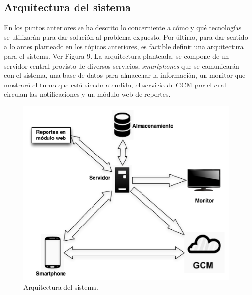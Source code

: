 \subsection{Arquitectura del sistema}

En los puntos anteriores se ha descrito lo concerniente a cómo y qué tecnologías se utilizarán para dar solución al problema expuesto. Por último, para dar sentido a lo antes planteado en los tópicos anteriores, es factible definir una arquitectura para el sistema. Ver Figura 9. La arquitectura planteada, se compone de un servidor central provisto de diversos servicios, \textit{smartphones} que se comunicarán con el sistema, una base de datos para almacenar la información, un monitor que mostrará el turno que está siendo atendido, el servicio de GCM por el cual circulan las notificaciones y un módulo web de reportes. 

\begin{figure}[H]
\centering
\includegraphics[scale=0.70]{images/capitulo3/arquitectura.png}
\caption{Arquitectura del sistema.}
\label{arquitectura}
\end{figure}